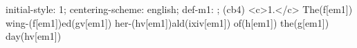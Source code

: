 initial-style: 1;
centering-scheme: english;
def-m1: \grealign;
(cb4) <c>1.</c> The(f[em1]) wing-(f[em1])ed(gv[em1]) her-(hv[em1])ald(ixiv[em1]) of(h[em1]) the(g[em1]) day(hv[em1])